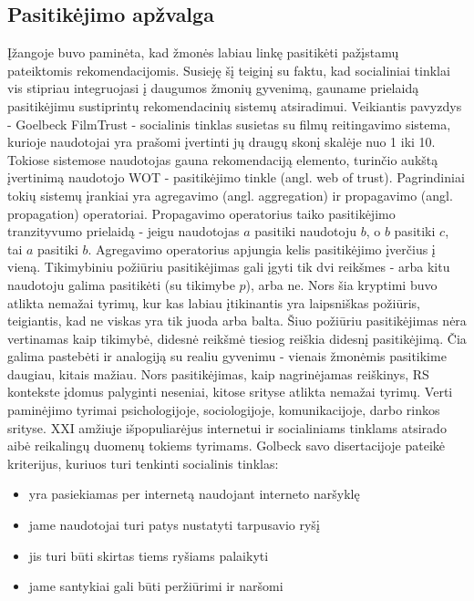 \documentclass{VUMIFInfMagistrinis}
\begin{document}
\subsection{Pasitikėjimo apžvalga}
Įžangoje buvo paminėta, kad žmonės labiau linkę pasitikėti pažįstamų pateiktomis rekomendacijomis. Susieję šį teiginį su faktu, kad socialiniai tinklai vis stipriau integruojasi į daugumos žmonių gyvenimą, gauname prielaidą pasitikėjimu sustiprintų rekomendacinių sistemų atsiradimui. Veikiantis pavyzdys - Goelbeck FilmTrust - socialinis tinklas susietas su filmų reitingavimo sistema, kurioje naudotojai yra prašomi įvertinti jų draugų skonį skalėje nuo 1 iki 10.
\newline
\indent
Tokiose sistemose naudotojas gauna rekomendaciją elemento, turinčio aukštą įvertinimą naudotojo WOT - pasitikėjimo tinkle (angl. web of trust). Pagrindiniai tokių sistemų įrankiai yra agregavimo (angl. aggregation) ir propagavimo (angl. propagation) operatoriai. Propagavimo operatorius taiko pasitikėjimo tranzityvumo prielaidą - jeigu naudotojas $a$ pasitiki naudotoju $b$, o $b$ pasitiki $c$, tai $a$ pasitiki $b$. Agregavimo operatorius apjungia kelis pasitikėjimo įverčius į vieną.
\newline
\indent
Tikimybiniu požiūriu pasitikėjimas gali įgyti tik dvi reikšmes - arba kitu naudotoju galima pasitikėti (su tikimybe $p$), arba ne. Nors šia kryptimi buvo atlikta nemažai tyrimų, kur kas labiau įtikinantis yra laipsniškas požiūris, teigiantis, kad ne viskas yra tik juoda arba balta. Šiuo požiūriu pasitikėjimas nėra vertinamas kaip tikimybė, didesnė reikšmė tiesiog reiškia didesnį pasitikėjimą. Čia galima pastebėti ir analogiją su realiu gyvenimu - vienais žmonėmis pasitikime daugiau, kitais mažiau. 
\newline
\indent
Nors pasitikėjimas, kaip nagrinėjamas reiškinys, RS kontekste įdomus palyginti neseniai,  kitose srityse atlikta nemažai tyrimų. Verti paminėjimo tyrimai psichologijoje, sociologijoje, komunikacijoje, darbo rinkos srityse. XXI amžiuje išpopuliarėjus internetui ir socialiniams tinklams atsirado aibė reikalingų duomenų tokiems tyrimams. Golbeck savo disertacijoje \cite{10} pateikė kriterijus, kuriuos turi tenkinti socialinis tinklas:
\begin{itemize}
	\item yra pasiekiamas per internetą naudojant interneto naršyklę
	\item jame naudotojai turi patys nustatyti tarpusavio ryšį
	\item jis turi būti skirtas tiems ryšiams palaikyti
	\item jame santykiai gali būti peržiūrimi ir naršomi
\end{itemize} 
\end{document}
